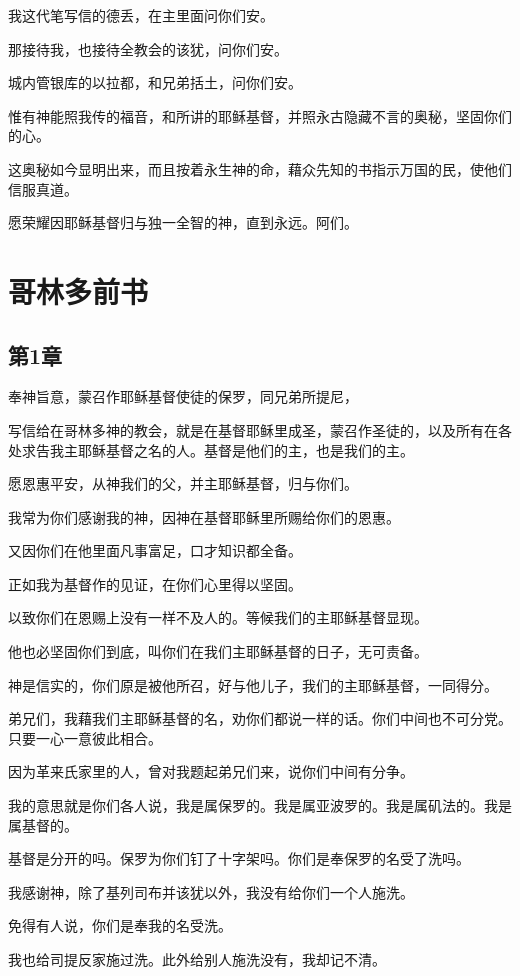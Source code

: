 \documentclass[12pt,oneside]{book}
\begin{document}
我这代笔写信的德丢，在主里面问你们安。

那接待我，也接待全教会的该犹，问你们安。

城内管银库的以拉都，和兄弟括土，问你们安。

惟有神能照我传的福音，和所讲的耶稣基督，并照永古隐藏不言的奥秘，坚固你们的心。

这奥秘如今显明出来，而且按着永生神的命，藉众先知的书指示万国的民，使他们信服真道。

愿荣耀因耶稣基督归与独一全智的神，直到永远。阿们。

\part{哥林多前书}
\chapter{第1章}
奉神旨意，蒙召作耶稣基督使徒的保罗，同兄弟所提尼，

写信给在哥林多神的教会，就是在基督耶稣里成圣，蒙召作圣徒的，以及所有在各处求告我主耶稣基督之名的人。基督是他们的主，也是我们的主。

愿恩惠平安，从神我们的父，并主耶稣基督，归与你们。

我常为你们感谢我的神，因神在基督耶稣里所赐给你们的恩惠。

又因你们在他里面凡事富足，口才知识都全备。

正如我为基督作的见证，在你们心里得以坚固。

以致你们在恩赐上没有一样不及人的。等候我们的主耶稣基督显现。

他也必坚固你们到底，叫你们在我们主耶稣基督的日子，无可责备。

神是信实的，你们原是被他所召，好与他儿子，我们的主耶稣基督，一同得分。

弟兄们，我藉我们主耶稣基督的名，劝你们都说一样的话。你们中间也不可分党。只要一心一意彼此相合。

因为革来氏家里的人，曾对我题起弟兄们来，说你们中间有分争。

我的意思就是你们各人说，我是属保罗的。我是属亚波罗的。我是属矶法的。我是属基督的。

基督是分开的吗。保罗为你们钉了十字架吗。你们是奉保罗的名受了洗吗。

我感谢神，除了基列司布并该犹以外，我没有给你们一个人施洗。

免得有人说，你们是奉我的名受洗。

我也给司提反家施过洗。此外给别人施洗没有，我却记不清。
\end{document}
